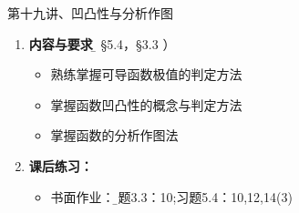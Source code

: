 \begin{frame}{第十九讲、凹凸性与分析作图}
	\linespread{1.5}
	\begin{enumerate}
	  \item {\bf 内容与要求}{\b（ \S 5.4，\S 3.3 ）}
	  \begin{itemize}
	    \item 熟练掌握可导函数极值的判定方法
	    \item 掌握函数凹凸性的概念与判定方法
	    \item 掌握函数的分析作图法
	  \vspace{1em}
	  \end{itemize}
	  \item {\bf 课后练习：}
	  \begin{itemize}
	    \item 书面作业：{\b 习题3.3：10;习题5.4：10,12,14(3)}
	  \end{itemize}
	\end{enumerate}
\end{frame}


